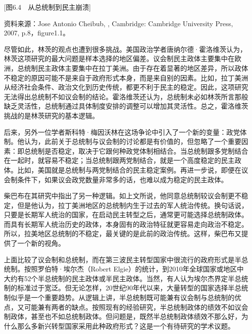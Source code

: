 [图6.4　从总统制到民主崩溃]

资料来源：Jose Antonio Cheibub, , Cambridge: Cambridge University Press, 2007, p.8，figure1.1。

尽管如此，林茨的观点也遭到很多挑战。美国政治学者唐纳尔德·霍洛维茨认为，林茨这项研究的最大问题是样本选择的地区偏差。议会制民主政体主要集中在欧洲，总统制民主政体主要集中在拉丁美洲。由于存在着显著的地区差异，所以政体不稳定的原因可能不是来自于政府形式本身，而是来自别的因素。比如，拉丁美洲从经济社会条件、政治文化到历史传统，都更不利于民主的稳定。因此，这项研究无法得出总统制不如议会制的结论。霍洛维茨还认为，总统制未必如林茨所言那般缺乏灵活性，总统制通过具体制度安排的调整可以增加其灵活性。总之，霍洛维茨挑战的是林茨研究的基本逻辑。

后来，另外一位学者斯科特·梅因沃林在这场争论中引入了一个新的变量：政党体制。他认为，此前关于总统制与议会制的讨论都是有价值的，但忽略了一个重要因素：即总统制是否稳定，取决于它跟何种政党体制相结合。当总统制跟多党制结合在一起时，就容易不稳定；当总统制跟两党制结合，就是一个高度稳定的民主政体。比如，美国就是总统制与两党制结合的民主稳定案例。再进一步说，即便在议会制条件下，如果议会政党数量非常多的话，也难以成为稳定的民主政体。

柴巴布在其研究中指出了另一种逻辑。如上文所说，他同意总统制较议会制更不稳定，但是他认为，拉丁美洲地区的总统制内生于过去的军人统治传统。换句话说，只要是长期军人统治的国家，在启动民主转型之后，通常更可能选择总统制政体。而具有长期军人统治历史的政体，本身固有的政治特征就更容易走向政治不稳定。所以，拉美地区总统制的不稳定，最关键的是此前的政治传统。这样，柴巴布又提供了一个新的视角。

上面比较了议会制和总统制，而在第三波民主转型国家中很流行的政府形式是半总统制。按照罗伯特·埃尔杰（Robert Elgie）的统计，到2010年全球国家或地区中大约有52个半总统制的民主政体或半民主政体。当然，有人认为埃尔杰界定半总统制的标准过于宽泛。但无论怎样，20世纪90年代以来，大量转型的国家选择半总统制似乎是一个重要趋势。从逻辑上讲，半总统制既可能兼有议会制与总统制的优点，又可能兼有两者的缺点。按照现有的经验研究，半总统制政体的绩效不如议会制政体，甚至也不如总统制政体。但问题是，既然半总统制政体绩效不那么好，为什么那么多新兴转型国家采用此种政府形式？这是一个有待研究的学术议题。


